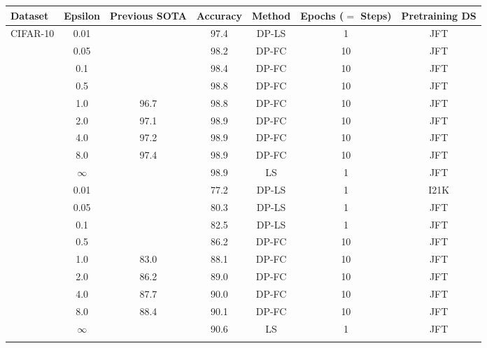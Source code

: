 \documentclass[letterpaper]{article} \usepackage{fullpage}
\begin{document}
\begin{table}[]
\centering
\small
\begin{tabular}{lcccccc}
    \toprule
        \addlinespace[0.1cm]
Dataset &                           Epsilon & Previous SOTA & Accuracy & Method & Epochs ($=$ Steps) & Pretraining DS  \\
\midrule
\multirow{9}{*}{CIFAR-10}
&         0.01  &       & 97.4 & DP-LS & 1 & JFT \\
&         0.05  &       & 98.2 & DP-FC & 10 & JFT \\
&         0.1    &     & 98.4 & DP-FC & 10 & JFT \\
&         0.5    &     & 98.8 & DP-FC & 10 & JFT \\
&        1.0     &  96.7   & 98.8 & DP-FC & 10 & JFT\\
&       2.0     &  97.1  & 98.9 & DP-FC & 10 & JFT\\
&      4.0      & 97.2   & 98.9 & DP-FC & 10 & JFT\\
&     8.0       & 97.4  & 98.9 & DP-FC & 10 & JFT\\
&    $\infty$   &    & 98.9 & LS & 1 & JFT\\

                                  \addlinespace[0.1cm]
                                         \hline
                                          \addlinespace[0.1cm]

\multirow{9}{*}{CIFAR-100} 
&         0.01  &       & 77.2 & DP-LS & 1 & I21K \\
&         0.05  &       & 80.3 & DP-LS & 1 & JFT \\
&         0.1   &      & 82.5 & DP-LS & 1 & JFT \\
&         0.5   &      & 86.2 & DP-FC & 10 & JFT \\
&        1.0    &  83.0   & 88.1 & DP-FC & 10 & JFT\\
&       2.0     &  86.2  & 89.0 & DP-FC & 10 & JFT\\
&      4.0      &  87.7  & 90.0 & DP-FC & 10 & JFT\\
&     8.0       &  88.4   & 90.1 & DP-FC & 10 & JFT\\
&    $\infty$   &   & 90.6 & LS & 1 & JFT\\

                                  \addlinespace[0.1cm]
                                         \hline
                                          \addlinespace[0.1cm]


\end{tabular}
\end{table}
\end{document}
